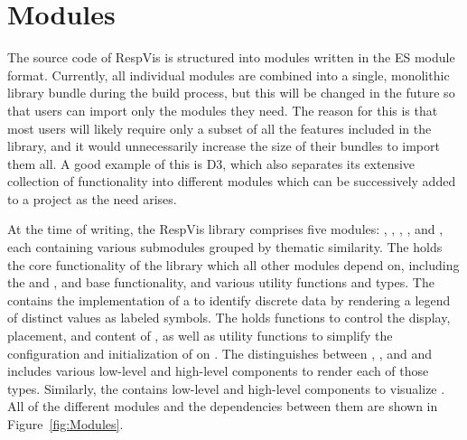 \chapter{Modules}
\label{chap:Modules}

The source code of RespVis is structured into modules written in the
ES module format. Currently, all individual modules are combined into
a single, monolithic library bundle during the build process, but this
will be changed in the future so that users can import only the
modules they need. The reason for this is that most users will likely
require only a subset of all the features included in the library, and
it would unnecessarily increase the size of their bundles to import
them all. A good example of this is D3, which also separates its
extensive collection of functionality into different modules which can
be successively added to a project as the need arises.

At the time of writing, the RespVis library comprises five modules:
, , , , and , each
containing various submodules grouped by thematic similarity. The
 holds the core functionality of the library
which all other modules depend on, including the 
and ,  and  base functionality, and various utility functions and
types. The  contains the implementation of a
 to identify discrete data by rendering a
legend of distinct values as labeled symbols. The  holds functions to control the display, placement, and
content of , as well as utility functions to
simplify the configuration and initialization of 
on . The 
distinguishes between , ,
and  and includes various low-level and
high-level components to render each of those types. Similarly, the
 contains low-level and high-level components to
visualize . All of the different modules and
the dependencies between them are shown in Figure~\ref{fig:Modules}.


